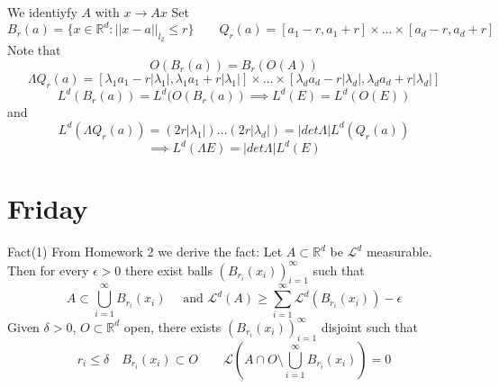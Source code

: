 \documentclass[11pt]{article}
\begin{document}
We identiyfy $A$ with  $x \to Ax$
Set 
\[
    B_r(a) = \{x \in \mathbb{R}^{d} : ||x -a||_{l_2} \le r\} \qquad Q_r(a) = [a_1-r,a_1+r] \times \dots \times [a_d - r, a_d + r]
\] 
Note that
\[
O(B_r(a)) = B_r(O(A))
\] 
\[
    \Lambda Q_r(a) = [\lambda_1 a_1 - r |\lambda_1|, \lambda_1 a_1 + r|\lambda_1|] \times \dots \times [\lambda_d a_d - r |\lambda_d|, \lambda_d a_d + r |\lambda_d|]
\] 
\[
L^{d}(B_r(a)) = L^{d}(O(B_r(a)) \implies L^{d}(E) = L^{d}(O(E))
\] 
and
\[
L^{d}(\Lambda Q_r(a)) = (2r |\lambda_1|) \dots (2r |\lambda_d|) = |det \Lambda| L^{d}(Q_r(a)) 
\] 
\[
\implies L^{d}(\Lambda E) = |det \Lambda| L^{d}(E)
\] 

\section{Friday}
Fact(1) From Homework 2 we derive the fact: Let $A \subset \mathbb{R}^{d}$ be $\mathcal{L}^{d}$ measurable.
Then for every $\epsilon > 0$ there exist balls $(B_{r_i}(x_i))_{i=1}^{\infty}$ such that
\[
    A \subset \bigcup_{i=1}^{\infty}B_{r_i}(x_i) \quad \text{ and } \mathcal{ L}^{d}(A) \ge \sum_{i=1}^{\infty} \mathcal{L}^{d}(B_{r_i}(x_i)) - \epsilon
\] 
Given $\delta > 0$, $O \subset \mathbb{R}^{d}$ open, there exists $(B_{r_i}(x_i))_{i=1}^{\infty}$ disjoint such that
\[
    r_i \le \delta \quad B_{r_i}(x_i) \subset O \qquad \mathcal{L}(A \cap O \setminus \bigcup_{i=1}^{\infty} B_{r_i}(x_i)) = 0
\] 
\end{document}
